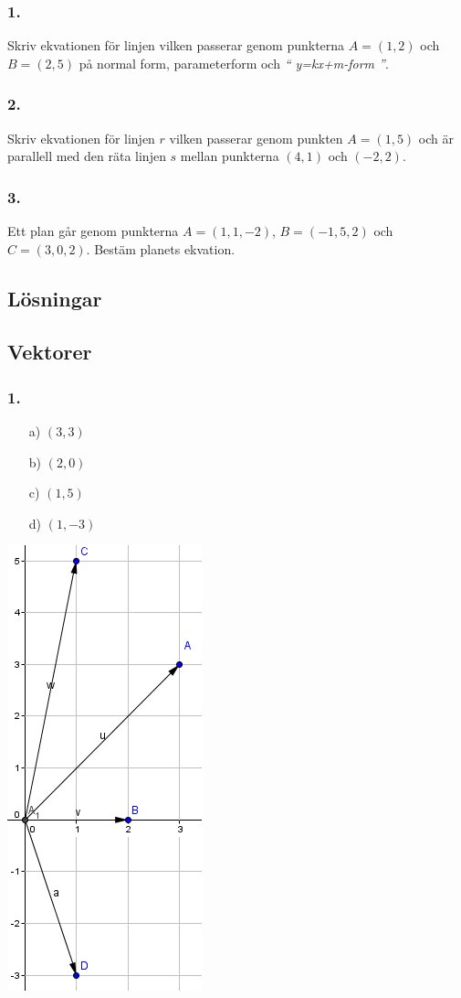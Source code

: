 \documentclass{article}
\begin{document}
\subsubsection*{1.}
Skriv ekvationen för linjen vilken passerar genom punkterna $A=(1,2)$ och 
$B=(2,5)$ på normal form, parameterform och {\it `` y=kx+m-form ''}.

\subsubsection*{2.}
Skriv ekvationen för linjen $r$ vilken passerar genom punkten $A=(1,5)$ och 
är parallell med den räta linjen $s$ mellan punkterna $(4,1)$ och $(-2,2)$.

\subsubsection*{3.}
Ett plan går genom punkterna $A=(1,1,-2)$, $B=(-1,5,2)$ och $C=(3,0,2)$.
Bestäm planets ekvation.\\


\clearpage
\subsection*{Lösningar}
\subsection*{Vektorer}
\subsubsection*{1.}
\begin{itemize}
\item[a) ] $(3,3)$  
\item[b) ] $(2,0)$  
\item[c) ] $(1,5)$  
\item[d) ] $(1,-3)$  
\end{itemize}
\includegraphics[scale=0.5]{graph_ans_1}
\end{document}
